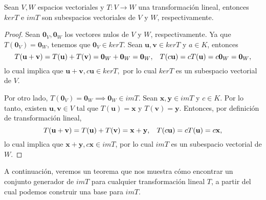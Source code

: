 \documentclass[12pt]{article}
\newenvironment{teorema}[2][Teorema]{\begin{trivlist}
\item[\hskip \labelsep {\bfseries #1}\hskip \labelsep {\bfseries #2.}]}{\end{trivlist}}
\begin{document}
\begin{teorema} {5.2.1}
   Sean $V,W$ espacios vectoriales y $T:V\to W$ una transformación lineal, entonces $kerT$ e $imT$ son subespacios vectoriales de $V$ y $W$, respectivamente.
   \begin{proof}
       Sean $\mathbf{0}_V, \mathbf{0}_W$ los vectores nulos de $V$ y $W$, respectivamente. Ya que $T(\mathbf{0}_V)=\mathbf{0}_W$, tenemos que $\mathbf{0}_V\in kerT.$ Sean $\mathbf{u}, \mathbf{v} \in kerT$ y $a\in K$, entonces $$T(\mathbf{u}+\mathbf{v})=T(\mathbf{u})+T(\mathbf{v})=\mathbf{0}_W+\mathbf{0}_W=\mathbf{0}_W,\hspace{3mm} T(c\mathbf{u})=cT(\mathbf{u})=c\mathbf{0}_W=\mathbf{0}_W,$$ \noindent lo cual implica que $\mathbf{u}+\mathbf{v},c\mathbf{u}\in kerT,$ por lo cual $kerT$ es un subespacio vectorial de $V$.

       Por otro lado, $T(\mathbf{0}_V)=\mathbf{0}_W\implies \mathbf{0}_W\in imT.$ Sean $\mathbf{x}, \mathbf{y}\in imT$ y $c\in K$. Por lo tanto, existen $\mathbf{u}, \mathbf{v}\in V$ tal que $T(\mathbf{u})=\mathbf{x}$ y $T(\mathbf{v})=\mathbf{y}.$ Entonces, por definición de transformación lineal, $$T(\mathbf{u}+\mathbf{v})=T(\mathbf{u})+T(\mathbf{v})=\mathbf{x}+\mathbf{y}, \hspace{3mm} T(c\mathbf{u})=cT(\mathbf{u})=c\mathbf{x},$$ lo cual implica que $\mathbf{x}+\mathbf{y}, c\mathbf{x}\in imT$, por lo cual $imT$ es un subespacio vectorial de $W$.

   \end{proof}
\end{teorema}

A continuación, veremos un teorema que nos muestra cómo encontrar un conjunto generador de $imT$ para cualquier transformación lineal $T$, a partir del cual podemos construir una base para $imT$.
\end{document}
